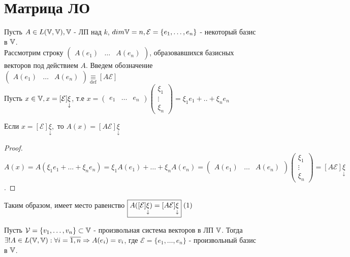 \documentclass[../main.tex]{subfiles}
\begin{document}
\section{Матрица ЛО}
Пусть $A\in L(\mathbb{V},\mathbb{V}), \mathbb{V}$ - ЛП над $k$, $dim\mathbb{V} = n, \mathcal{E} = \{e_{1},\dots,e_{n}\}$ - некоторый базис в $\mathbb{V}$.
\\Рассмотрим строку $\begin{pmatrix}
    A(e_{1}) & \dots & A(e_{n})
\end{pmatrix}$, образовавшихся базисных векторов под действием $A$. Введем обозначение $\begin{pmatrix}
    A(e_{1}) & \dots & A(e_{n})
\end{pmatrix}\underset{\text{def}}{\equiv} [A\mathcal{E}]$
\\Пусть $x\in\mathbb{V}, x= [\mathcal{E}]\underset{\downarrow}{\xi}$, т.е $x=\begin{pmatrix}
    e_{1} & \dots & e_{n}
\end{pmatrix}\begin{pmatrix}
    \xi_{1} \\ 
    \vdots\\ 
    \xi_{n}
\end{pmatrix} = \xi_{1}e_{1}+..+\xi_{n}e_{n}$
\begin{theorem}
    Если $x= [\mathcal{E}]\underset{\downarrow}{\xi},$ то $A(x)=[A\mathcal{E}]\underset{\downarrow}{\xi}$
\end{theorem}
\begin{proof}
    $A(x)= A(\xi_{1}e_{1}+\dots+\xi_{n}e_{n})=\xi_{1} A(e_{1})+\dots+\xi_{n}A(e_{n})=\begin{pmatrix}
        A(e_{1})&\dots&A(e_{n})
    \end{pmatrix}\begin{pmatrix}
        \xi_{1}\\
        \vdots\\
        \xi_{n}
    \end{pmatrix} =  [A\mathcal{E}]\underset{\downarrow}{\xi}$.
\end{proof}
Таким образом, имеет место равенство $\fbox{$A([\mathcal{E}]\underset{\downarrow}{\xi})=[A\mathcal{E}]\underset{\downarrow}{\xi}$}\;(1)$
\vspace{0.5cm}
\begin{theorem}[О задании ЛО]
   Пусть $\mathcal{V}=\{v_{1},\dots,v_{n}\}\subset \mathbb{V}$ - произвольная система векторов в ЛП $\mathbb{V}$. Тогда $\exists! A \in L(\mathbb{V},\mathbb{V}): \forall i=\overline{1,n}\Rightarrow A(e_{i})=v_{i}$, где $\mathcal{E}=\{e_{1},\dots,e_{n}\}$ - произвольный базис в $\mathbb{V}$.  
\end{theorem}
\end{document}
